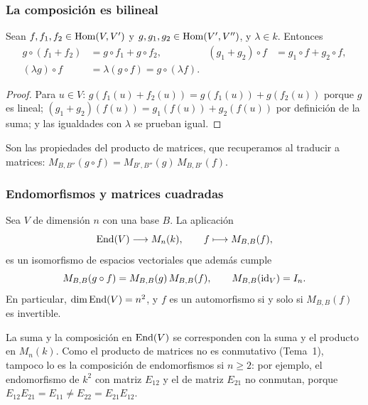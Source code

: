 \begin{frame}
    \frametitle{La composición es bilineal}

    \begin{proposition}
        Sean $f,f_1,f_2\in\operatorname{Hom}(V,V')$ y $g,g_1,g_2\in\operatorname{Hom}(V',V'')$, y
        $\lambda\in k$. Entonces
        \begin{align*}
            g\circ(f_1+f_2)&=g\circ f_1+g\circ f_2,
            &(g_1+g_2)\circ f&=g_1\circ f+g_2\circ f,\\
            (\lambda g)\circ f&=\lambda(g\circ f)=g\circ(\lambda f).
        \end{align*}
    \end{proposition}

    \begin{proof}
        Para $u\in V$: $g(f_1(u)+f_2(u))=g(f_1(u))+g(f_2(u))$ porque $g$ es
        lineal; $(g_1+g_2)(f(u))=g_1(f(u))+g_2(f(u))$ por definición de
        la suma; y las igualdades con $\lambda$ se prueban igual.
    \end{proof}

    \medskip

    Son las propiedades del producto de matrices, que recuperamos al
    traducir a matrices: $M_{B,B''}(g\circ f)=M_{B',B''}(g)\,M_{B,B'}(f)$.
\end{frame}


\begin{frame}
    \frametitle{Endomorfismos y matrices cuadradas}

    \begin{proposition}
        Sea $V$ de dimensión $n$ con una base $B$. La aplicación
        \[
            \operatorname{End}(V)\longrightarrow M_n(k),\qquad f\longmapsto M_{B,B}(f),
        \]
        es un isomorfismo de espacios vectoriales que además cumple
        \[
            M_{B,B}(g\circ f)=M_{B,B}(g)\,M_{B,B}(f),\qquad M_{B,B}(\operatorname{id}_V)=I_n.
        \]
        En particular, $\dim\operatorname{End}(V)=n^2$, y $f$ es un automorfismo si y solo
        si $M_{B,B}(f)$ es invertible.
    \end{proposition}

    \medskip

    La suma y la composición en $\operatorname{End}(V)$ se corresponden con la suma y el
    producto en $M_n(k)$. Como el producto de matrices no es conmutativo
    (Tema~1), tampoco lo es la composición de endomorfismos si $n\geq2$:
    por ejemplo, el endomorfismo de $k^2$ con matriz $E_{12}$ y el de
    matriz $E_{21}$ no conmutan, porque $E_{12}E_{21}=E_{11}\neq
    E_{22}=E_{21}E_{12}$.
\end{frame}
